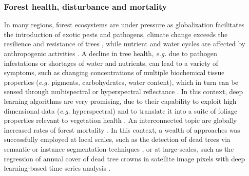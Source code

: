\documentclass{CUP-JNL-DTM}%
\theoremstyle{definition}
\numberwithin{equation}{section}
\begin{document}
\subsubsection{Forest health, disturbance and mortality} 
\label{sec:topic_health}
In many regions, forest ecosystems are under pressure as globalization facilitates the introduction of exotic pests and pathogens, climate change exceeds the resilience and resistance of trees \citep{hartmann_climate_2022}, while nutrient and water cycles are affected by anthropogenic activities \citep{steffen_global_2005, trumbore_forest_2015}. A decline in tree health, \textit{e.g.} due to pathogen infestations or shortages of water and nutrients, can lead to a variety of symptoms, such as changing concentrations of multiple biochemical tissue properties (\textit{e.g.} pigments, carbohydrates, water content), which in turn can be sensed through multispectral or hyperspectral reflectance \citep{zarco-tejada_chlorophyll_2019, zarco-tejada_previsual_2018}. 
In this context, deep learning algorithms are very promising, due to their capability to exploit high dimensional data (\textit{e.g.} hyperspectral) and to translate it into a suite of foliage properties relevant to vegetation health \cite{cherif_spectra_2023}. %
An interconnected topic are globally increased rates of forest mortality \citep{hartmann_climate_2022, allen_global_2010}. In this context, a wealth of approaches was successfully employed at local scales, such as the detection of dead trees via semantic or instance segmentation techniques \citep{cloutier_influence_2023, sani-mohammed_instance_2022}, or at large-scales, such as the regression of annual cover of dead tree crowns in satellite image pixels with deep learning-based time series analysis \citep{schiefer_uav-based_2023}.
\end{document}
